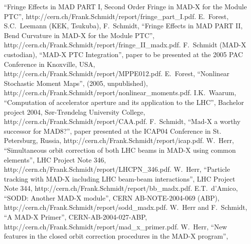 \documentclass[12pt]{article} \textwidth 17cm \hoffset -2cm
\begin{document}
\begin{thebibliography}{99}
  ``Fringe Effects in MAD PART I, Second Order Fringe in MAD-X for the
  Module PTC'',
  {http://cern.ch/Frank.Schmidt/report/fringe\_part\_I.pdf}.
%
 E.~Forest, S.C.~Leemann (KEK, Tsukuba), F.~Schmidt,
  ``Fringe Effects in MAD PART II, Bend Curvature in MAD-X for the
  Module PTC'',
  {http://cern.ch/Frank.Schmidt/report/fringe\_II\_madx.pdf}.
%
 F.~Schmidt (MAD-X custodian), ``MAD-X PTC
  Integration'', paper to be   presented at the 2005 PAC Conference in
  Knoxville, USA, 
  {http://cern.ch/Frank.Schmidt/report/MPPE012.pdf}.
%
 E.~Forest, ``Nonlinear Stochastic Moment Maps'',
  (2005, unpublished),
  {http://cern.ch/Frank.Schmidt/report/nonlinear\_moments.pdf}.
%
 I.K.~Waarum, ``Computation of accelerator aperture
  and its application to the LHC'', Bachelor project 2004,
  S\o r-Tr\o ndelag University College,
  {http://cern.ch/Frank.Schmidt/report/CAA.pdf}.
%
 F.~Schmidt, ``Mad-X a worthy successor for MAD8?'',
  paper presented at the ICAP04 Conference in St. Petersburg, Russia, 
  {http://cern.ch/Frank.Schmidt/report/icap.pdf}.
%
 W.~Herr, ``Simultaneous orbit correction of both LHC
  beams in MAD-X using common elements'',
LHC Project Note 346,
  {http://cern.ch/Frank.Schmidt/report/LHCPN\_346.pdf}.
%
 W.~Herr, ``Particle tracking with MAD-X including LHC
  beam-beam interactions'',
LHC Project Note 344,
  {http://cern.ch/Frank.Schmidt/report/bb\_madx.pdf}.
%
 E.T.~d'Amico, ``SODD: Another MAD-X module'',
CERN AB-NOTE-2004-069 (ABP),
  {http://cern.ch/Frank.Schmidt/report/sodd\_madx.pdf}.
%
 W.~Herr and F.~Schmidt, ``A MAD-X Primer'',
CERN-AB-2004-027-ABP,
  {http://cern.ch/Frank.Schmidt/report/mad\_x\_primer.pdf}.
%
 W.~Herr, ``New features in the closed orbit
  correction procedures in the MAD-X program'',

\end{thebibliography}
\end{document}
